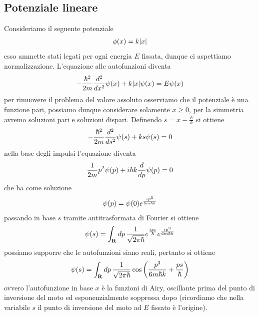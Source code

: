\documentclass{article}
\begin{document}
\subsection{Potenziale lineare}
Consideriamo il seguente potenziale
\begin{gather}
    \phi(x) = k|x| \notag
\end{gather}
esso ammette stati legati per ogni energia $E$ fissata, dunque ci aspettiamo normalizzazione. L'equazione alle autofunzioni diventa
\begin{gather}
    -\frac{\hbar^2}{2m}\frac{d^2}{dx^2}\psi(x) + k|x|\psi(x) = E\psi(x) \notag
\end{gather}
per rimuovere il problema del valore assoluto osserviamo che il potenziale è una funzione pari, possiamo dunque considerare solamente $x \geq 0$, per la simmetria avremo soluzioni pari e soluzioni dispari. Definendo $s = x - \frac{E}{k}$ si ottiene
\begin{gather}
    -\frac{\hbar^2}{2m}\frac{d^2}{ds^2}\psi(s) + ks\psi(s) = 0 \notag
\end{gather}
nella base degli impulsi l'equazione diventa
\begin{gather}
    \frac{1}{2m}p^2\psi(p) + i\hbar k\frac{d}{dp}\psi(p) = 0 \notag
\end{gather}
che ha come soluzione
\begin{gather}
    \psi(p) = \psi(0)e^{\frac{ip^3}{6m\hbar k}} \notag
\end{gather}
passando in base $s$ tramite antitrasformata di Fourier si ottiene
\begin{gather}
    \psi(s) = \int_{\mathbf{R}}dp\, \frac{1}{\sqrt{2\pi\hbar}}e^{\frac{ips}{\hbar}}e^{\frac{ip^3}{6m\hbar k}} \notag
\end{gather}
possiamo supporre che le autofunzioni siano reali, pertanto si ottiene
\begin{gather}
    \psi(s) = \int_{\mathbf{R}}dp \, \frac{1}{\sqrt{2\pi\hbar}}\cos\left( \frac{p^3}{6m\hbar k} + \frac{ps}{\hbar} \right) \notag
\end{gather}
ovvero l'autofunzione in base $x$ è la funzioni di Airy, oscillante prima del punto di inversione del moto ed esponenzialmente soppressa dopo (ricordiamo che nella variabile $s$ il punto di inversione del moto ad $E$ fissato è l'origine).
\end{document}
